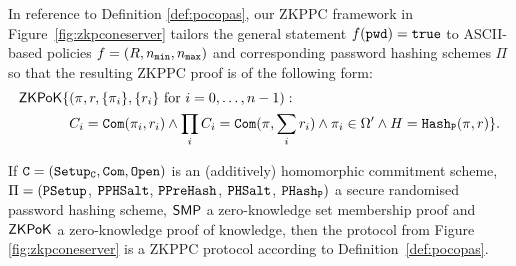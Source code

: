 \noindent
In reference to Definition \ref{def:pocopas}, our \ac{ZKPPC} framework in Figure~\ref{fig:zkpconeserver} tailors the general statement $f(\mathtt{pwd})=\mathtt{true}$ to \ac{ASCII}-based policies $f=(R,{n_\mathtt{min}},{n_\mathtt{max}})$ and corresponding password hashing schemes $\Pi$ so that the resulting \ac{ZKPPC} proof is of the following form:
\begin{align*}
\mathsf{ZKPoK}\{&(\pi,r,\{\pi_i\},\{r_i\}\textrm{ for }i=0,\ldots,n-1):\\
& C_i=\mathtt{Com}(\pi_i, r_i) \wedge \prod_iC_i=\mathtt{Com}(\pi, \sum_ir_i) \wedge \pi_i\in\Omega' \wedge H=\mathtt{Hash_P}(\pi,r)\}.
\end{align*}

\begin{theorem}\label{theo:singlegen}
If $\mathtt{C}=(\mathtt{Setup_C},\mathtt{Com},\mathtt{Open})$ is an (additively) homomorphic commitment scheme, $\Pi=(\mathtt{PSetup}$, $\mathtt{PPHSalt}$, $\mathtt{PPreHash}$, $\mathtt{PHSalt}$, $\mathtt{PHash_P})$ a secure randomised password hashing scheme, $\mathsf{SMP}$ a zero-knowledge set membership proof and $\mathsf{ZKPoK}$ a zero-knowledge proof of knowledge, then the protocol from Figure \ref{fig:zkpconeserver} is a \ac{ZKPPC} protocol according to Definition~\ref{def:pocopas}.
\end{theorem}

